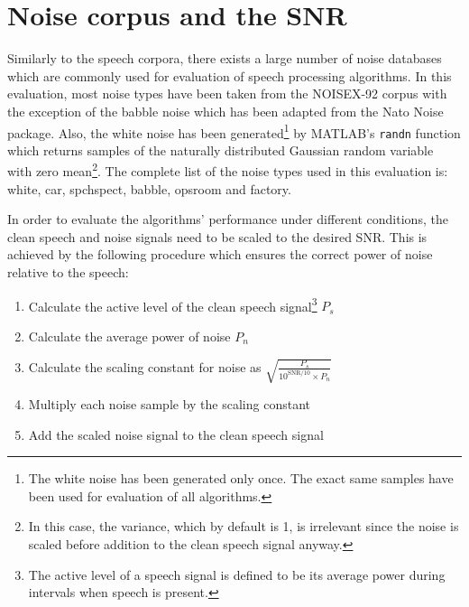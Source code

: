 
\section{Noise corpus and the SNR}

Similarly to the speech corpora, there exists a large number of noise databases which are commonly used for evaluation of speech processing algorithms. In this evaluation, most noise types have been taken from the NOISEX-92 \cite{NOISEX} corpus with the exception of the babble noise which has been adapted from the Nato Noise \cite{Nato} package. Also, the white noise has been generated\footnote{The white noise has been generated only once. The exact same samples have been used for evaluation of all algorithms.} by MATLAB's \texttt{randn} function which returns samples of the naturally distributed Gaussian random variable with zero mean\footnote{In this case, the variance, which by default is 1, is irrelevant since the noise is scaled before addition to the clean speech signal anyway.}. The complete list of the noise types used in this evaluation is: white, car, spchspect, babble, opsroom and factory.

In order to evaluate the algorithms' performance under different conditions, the clean speech and noise signals need to be scaled to the desired SNR. This is achieved by the following procedure which ensures the correct power of noise relative to the speech:

\begin{enumerate}
\item Calculate the active level of the clean speech signal\footnote{The active level of a speech signal is defined to be its average power during intervals when speech is present.} $P_s$
\item Calculate the average power of noise $P_n$
\item Calculate the scaling constant for noise as $\sqrt{\frac{P_s}{10^{\text{SNR}/10} \times P_n}}$
\item Multiply each noise sample by the scaling constant
\item Add the scaled noise signal to the clean speech signal
\end{enumerate}


